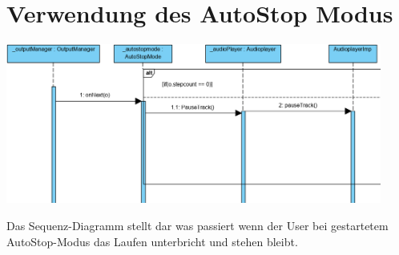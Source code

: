\documentclass[../entwurf.tex]{subfiles}
\begin{document}
\section{Verwendung des AutoStop Modus}
\begin{center}
	\includegraphics[page=1,width=350pt,keepaspectratio]{../graphics/sequenz_diagramme/AutoStopDia.png}
\end{center}
Das Sequenz-Diagramm stellt dar was passiert wenn der User bei gestartetem AutoStop-Modus das Laufen unterbricht und stehen bleibt.
\end{document}
